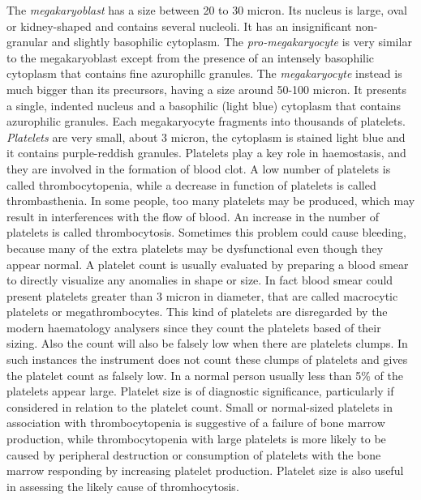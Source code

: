 \documentclass[final,a4paper,12pt,english]{UnicaPhdThesis3}
\begin{document}
The \textit{megakaryoblast} has a size between 20 to 30 micron. Its nucleus is large, oval or kidney-shaped and contains several nucleoli. It has an insignificant non-granular and slightly basophilic cytoplasm. The \textit{pro-megakaryocyte} is very similar to the megakaryoblast except from the presence of an intensely basophilic cytoplasm that contains fine azurophillc granules. The \textit{megakaryocyte} instead is much bigger than its precursors, having a size around 50-100 micron. It presents a single, indented nucleus and a basophilic (light blue) cytoplasm that contains azurophilic granules. Each megakaryocyte fragments into thousands of platelets. \textit{Platelets} are very small, about 3 micron, the cytoplasm is stained light blue and it contains purple-reddish granules. Platelets play a key role in haemostasis, and they are involved in the formation of blood clot. A low number of platelets is called thrombocytopenia, while a decrease in function of platelets is called thrombasthenia. In some people, too many platelets may be produced, which may result in interferences with the flow of blood. An increase in the number of platelets is called thrombocytosis. Sometimes this problem could cause bleeding, because many of the extra platelets may be dysfunctional even though they appear normal. A platelet count is usually evaluated by preparing a blood smear to directly visualize any anomalies in shape or size. In fact blood smear could present platelets greater than 3 micron in diameter, that are called macrocytic platelets or megathrombocytes. This kind of platelets are disregarded by the modern haematology analysers since they count the platelets based of their sizing. Also the count will also be falsely low when there are platelets clumps. In such instances the instrument does not count these clumps of platelets and gives the platelet count as falsely low. In a normal person usually less than 5\% of the platelets appear large. Platelet size is of diagnostic significance, particularly if considered in relation to the platelet count. Small or normal-sized platelets in association with thrombocytopenia is suggestive of a failure of bone marrow production, while thrombocytopenia with large platelets is more likely to be caused by peripheral destruction or consumption of platelets with the bone marrow responding by increasing platelet production. Platelet size is also useful in assessing the likely cause of thromhocytosis. 

\ifdraft{
  \listoffixmes
}{}
\end{document}
